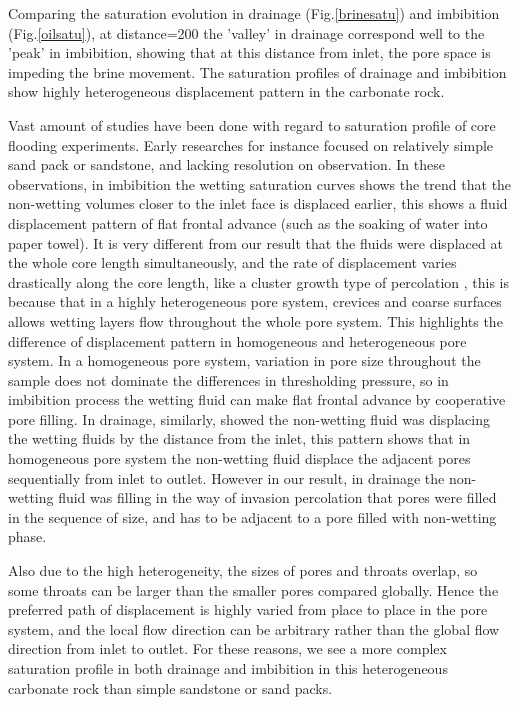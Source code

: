 Comparing the saturation evolution in drainage (Fig.\ref{brinesatu}) and imbibition (Fig.\ref{oilsatu}), at distance=200 the 'valley' in drainage correspond well to the 'peak' in imbibition, showing that at this distance from inlet, the pore space is impeding the brine movement. The saturation profiles of drainage and imbibition show highly heterogeneous displacement pattern in the carbonate rock.

Vast amount of studies have been done with regard to saturation profile of core flooding experiments. Early researches for instance \citet{peters1990visualization,graue1990imaging} focused on relatively simple sand pack or sandstone, and lacking resolution on observation. In these observations, in imbibition the wetting saturation curves shows the trend that the non-wetting volumes closer to the inlet face is displaced earlier, this shows a fluid displacement pattern of flat frontal advance (such as the soaking of water into paper towel). It is very different from our result that the fluids were displaced at the whole core length simultaneously, and the rate of displacement varies drastically along the core length, like a cluster growth type of percolation \citep{blunt1995pore}, this is because that in a highly heterogeneous pore system, crevices and coarse surfaces allows wetting layers flow throughout the whole pore system. This highlights the difference of displacement pattern in homogeneous and heterogeneous pore system. In a homogeneous pore system, variation in pore size throughout the sample does not dominate the differences in thresholding pressure, so in imbibition process the wetting fluid can make flat frontal advance by cooperative pore filling. In drainage, similarly, \citet{peters1990visualization,graue1990imaging} showed the non-wetting fluid was displacing the wetting fluids by the distance from the inlet, this pattern shows that in homogeneous pore system the non-wetting fluid displace the adjacent pores sequentially from inlet to outlet. However in our result, in drainage the non-wetting fluid was filling in the way of invasion percolation \citep{lenormand1980description} that pores were filled in the sequence of size, and has to be adjacent to a pore filled with non-wetting phase.

Also due to the high heterogeneity, the sizes of pores and throats overlap, so some throats can be larger than the smaller pores compared globally. Hence the preferred path of displacement is highly varied from place to place in the pore system, and the local flow direction can be arbitrary rather than the global flow direction from inlet to outlet. For these reasons, we see a more complex saturation profile in both drainage and imbibition in this heterogeneous carbonate rock than simple sandstone or sand packs. 

